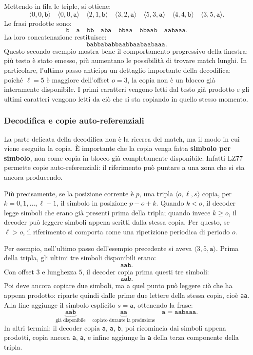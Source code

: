 \documentclass{article}
\theoremstyle{definition}
\numberwithin{equation}{section}
\begin{document}
Mettendo in fila le triple, si ottiene:
\[
    \langle 0,0,\texttt{b}\rangle\quad
    \langle 0,0,\texttt{a}\rangle\quad
    \langle 2,1,\texttt{b}\rangle\quad
    \langle 3,2,\texttt{a}\rangle\quad
    \langle 5,3,\texttt{a}\rangle\quad
    \langle 4,4,\texttt{b}\rangle\quad
    \langle 3,5,\texttt{a}\rangle.
\]
Le frasi prodotte sono:
\[
    \texttt{b}\quad
    \texttt{a}\quad
    \texttt{bb}\quad
    \texttt{aba}\quad
    \texttt{bbaa}\quad
    \texttt{bbaab}\quad
    \texttt{aabaaa}.
\]
La loro concatenazione restituisce:
\[
    \texttt{babbababbaabbaabaabaaa}.
\]
Questo secondo esempio mostra bene il comportamento progressivo della finestra:
più testo è stato emesso, più aumentano le possibilità di trovare match lunghi.
In particolare, l'ultimo passo anticipa un dettaglio importante della
decodifica: poiché $\ell=5$ è maggiore dell'offset $o=3$, la copia non è
un blocco già interamente disponibile. I primi caratteri vengono letti dal
testo già prodotto e gli ultimi caratteri vengono letti da ciò che si sta
copiando in quello stesso momento.

\subsubsection{Decodifica e copie auto-referenziali}
La parte delicata della decodifica non è la ricerca del match, ma il modo
in cui viene eseguita la copia. È importante che la copia venga fatta
\textbf{simbolo per simbolo}, non come copia in blocco già completamente
disponibile. Infatti LZ77 permette copie auto-referenziali: il riferimento
può puntare a una zona che si sta ancora producendo.

Più precisamente, se la posizione corrente è $p$, una tripla
$\langle o,\ell,s\rangle$ copia, per $k=0,1,\ldots,\ell-1$, il simbolo in
posizione $p-o+k$. Quando $k<o$, il decoder legge simboli che erano già
presenti prima della tripla; quando invece $k\geq o$, il decoder può
leggere simboli appena scritti dalla stessa copia. Per questo, se
$\ell>o$, il riferimento si comporta come una ripetizione periodica di
periodo $o$.

Per esempio, nell'ultimo passo dell'esempio precedente si aveva
$\langle 3,5,\texttt{a}\rangle$. Prima della tripla, gli ultimi tre simboli
disponibili erano:
\[
    \texttt{aab}.
\]
Con offset $3$ e lunghezza $5$, il decoder copia prima questi tre simboli:
\[
    \texttt{aab}.
\]
Poi deve ancora copiare due simboli, ma a quel punto può leggere ciò che ha
appena prodotto: riparte quindi dalle prime due lettere della stessa copia,
cioè \texttt{aa}. Alla fine aggiunge il simbolo esplicito
$s=\texttt{a}$, ottenendo la frase:
\[
    \underbrace{\texttt{aab}}_{\text{già disponibile}}
    \quad
    \underbrace{\texttt{aa}}_{\text{copiato durante la produzione}}
    \quad
    \texttt{a}
    =
    \texttt{aabaaa}.
\]
In altri termini: il decoder copia \texttt{a}, \texttt{a}, \texttt{b},
poi ricomincia dai simboli appena prodotti, copia ancora \texttt{a},
\texttt{a}, e infine aggiunge la \texttt{a} della terza componente della
tripla.
\end{document}
